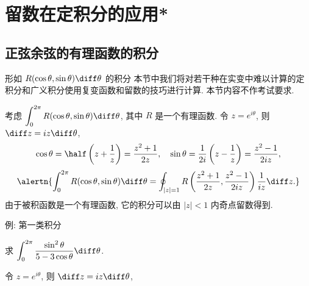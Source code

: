 \section{留数在定积分的应用*}

\subsection{正弦余弦的有理函数的积分}

\begin{frame}{形如 $R(\cos\theta,\sin\theta)\diff\theta$ 的积分\noexer}
	\onslide<+->
	本节中我们将对若干种在实变中难以计算的定积分和广义积分使用复变函数和留数的技巧进行计算.
	\onslide<+->
	本节内容不作考试要求.

	\onslide<+->
	考虑 $\displaystyle\int_0^{2\pi} R(\cos\theta,\sin\theta)\diff\theta$, 其中 $R$ 是一个有理函数.
	\onslide<+->
	令 $z=e^{i\theta}$, 则 $\diff z=iz\diff\theta$,
	\onslide<+->
	\[\cos\theta=\half\left(z+\frac1z\right)=\frac{z^2+1}{2z},\quad
	\sin\theta=\frac1{2i}\left(z-\frac1z\right)=\frac{z^2-1}{2iz},\]
	\onslide<+->
	\[\alertn{\int_0^{2\pi} R(\cos\theta,\sin\theta)\diff\theta=\oint_{|z|=1}R\left(\frac{z^2+1}{2z},\frac{z^2-1}{2iz}\right)\frac1{iz}\diff z.}\]
	\onslide<+->
	由于被积函数是一个有理函数, 它的积分可以由 $|z|<1$ 内奇点留数得到.
\end{frame}


\begin{frame}{例: 第一类积分\noexer}\small
	\beqskip{1pt}
	\onslide<+->
	\begin{example}
		求 $\displaystyle\int_0^{2\pi}\frac{\sin^2\theta}{5-3\cos\theta}\diff\theta$.
	\end{example}

	\onslide<+->
	\begin{solution}
		令 $z=e^{i\theta}$, 则 $\diff z=iz\diff\theta$,
		\onslide<+->{
			\[\cos\theta=\half\left(z+\frac1z\right)=\frac{z^2+1}{2z},\qquad
			\sin\theta=\frac1{2i}\left(z-\frac1z\right)=\frac{z^2-1}{2iz},\]
		}\onslide<+->{
			\[
				\int_0^{2\pi}\frac{\sin^2\theta}{5-3\cos\theta}\diff\theta
				=\oint_{|z|=1}\frac{(z^2-1)^2}{-4z^2}\cdot\frac1{5-3\dfrac{z^2+1}{2z}}\cdot\frac{\diff z}{iz}
				=-\frac i6\oint_{|z|=1}\frac{(z^2-1)^2}{z^2(z-3)(z-\dfrac13)}\diff z.
			\]
		}\onslide<+->{%
			则
			$\Res[f(z),0]=\dfrac{10}3, \Res[f(z),\dfrac13]=-\dfrac83$,
		}
		\onslide<+->{
			\[
				\int_0^{2\pi}\frac{\sin^2\theta}{5-3\cos\theta}\diff\theta
				=-\frac i6\cdot 2\pi i\Bigl[\Res[f(z),0]+\Res[f(z),\frac13]\Bigr]
				=\frac{2\pi}9.
			\]
		}
		\vspace{-.5\baselineskip}
	\end{solution}
	\endgroup
\end{frame}

